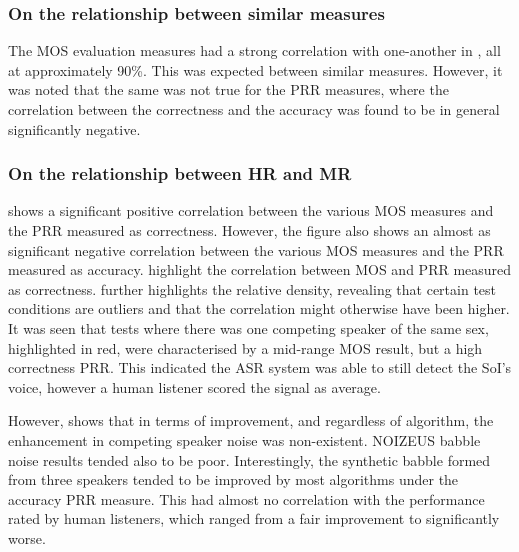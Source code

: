 \subsubsection*{On the relationship between similar measures}

The \ac{MOS} evaluation measures had a strong correlation with one-another
in , all at approximately 90\%. This was expected
between similar measures. However, it was noted that the same was
not true for the \ac{PRR} measures, where the correlation between
the correctness and the accuracy was found to be in general significantly
negative.


\subsubsection*{On the relationship between \acl{HR} and \acl{MR}}

 shows a significant positive correlation between
the various \ac{MOS} measures and the \ac{PRR} measured as correctness.
However, the figure also shows an almost as significant negative correlation
between the various \ac{MOS} measures and the \ac{PRR} measured
as accuracy.  highlight
the correlation between \ac{MOS} and \ac{PRR} measured as correctness.
 further highlights the relative density, revealing
that certain test conditions are outliers and that the correlation
might otherwise have been higher. It was seen that tests where there
was one competing speaker of the same sex, highlighted in red, were
characterised by a mid-range \ac{MOS} result, but a high correctness
\ac{PRR}. This indicated the \ac{ASR} system was able to still detect
the \ac{SoI}'s voice, however a human listener scored the signal
as average.

However,  shows that in terms of improvement,
and regardless of algorithm, the enhancement in competing speaker
noise was non-existent. NOIZEUS babble noise results tended also to
be poor. Interestingly, the synthetic babble formed from three speakers
tended to be improved by most algorithms under the accuracy \ac{PRR}
measure. This had almost no correlation with the performance rated
by human listeners, which ranged from a fair improvement to significantly
worse.

